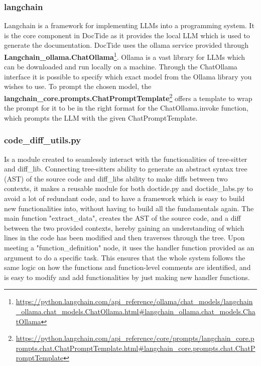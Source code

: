 \subsubsection*{langchain}
Langchain is a framework for implementing LLMs into a programming system. It is the core component in DocTide as it provides the local LLM which is used to generate the documentation. DocTide uses the ollama service provided through \textbf{Langchain\_ollama.ChatOllama}\footnote{\url{https://python.langchain.com/api_reference/ollama/chat_models/langchain_ollama.chat_models.ChatOllama.html#langchain_ollama.chat_models.ChatOllama}}. Ollama is a vast library for LLMs which can be downloaded and run locally on a machine. Through the ChatOllama interface it is possible to specify which exact model from the Ollama library you wishes to use. To prompt the chosen model, the \textbf{langchain\_core.prompts.ChatPromptTemplate}\footnote{\url{https://python.langchain.com/api_reference/core/prompts/langchain_core.prompts.chat.ChatPromptTemplate.html#langchain_core.prompts.chat.ChatPromptTemplate}} offers a template to wrap the prompt for it to be in the right format for the ChatOllama.invoke function, which prompts the LLM with the given ChatPromptTemplate.
\subsubsection*{code\_diff\_utils.py}
Is a module created to seamlessly interact with the functionalities of tree-sitter and diff\_lib. Connecting tree-sitters ability to generate an abstract syntax tree (AST) of the source code and diff\_libs ability to make diffs between two contexts, it makes a reusable module for both doctide.py and doctide\_labs.py to avoid a lot of redundant code, and to have a framework which is easy to build new functionalities into, without having to build all the fundamentals again. The main function "extract\_data", creates the AST of the source code, and a diff between the two provided contexts, hereby gaining an understanding of which lines in the code has been modified and then traverses through the tree. Upon meeting a "function\_definition" node, it uses the handler function provided as an argument to do a specific task. This ensures that the whole system follows the same logic on how the functions and function-level comments are identified, and is easy to modify and add functionalities by just making new handler functions.

